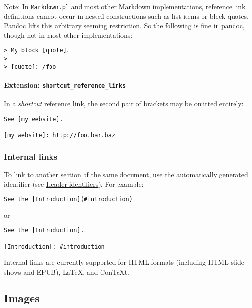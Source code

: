 \documentclass[]{article}
\let\oldparagraph\paragraph
\renewcommand{\paragraph}[1]{\oldparagraph{#1}\mbox{}}
\begin{document}
Note: In \texttt{Markdown.pl} and most other Markdown implementations,
reference link definitions cannot occur in nested constructions such as
list items or block quotes. Pandoc lifts this arbitrary seeming
restriction. So the following is fine in pandoc, though not in most
other implementations:

\begin{verbatim}
> My block [quote].
>
> [quote]: /foo
\end{verbatim}

\paragraph{\texorpdfstring{Extension:
\texttt{shortcut\_reference\_links}}{Extension: shortcut\_reference\_links}}\label{extension-shortcut_reference_links}

In a \emph{shortcut} reference link, the second pair of brackets may be
omitted entirely:

\begin{verbatim}
See [my website].

[my website]: http://foo.bar.baz
\end{verbatim}

\subsubsection{Internal links}\label{internal-links}

To link to another section of the same document, use the automatically
generated identifier (see \protect\hyperlink{header-identifiers}{Header
identifiers}). For example:

\begin{verbatim}
See the [Introduction](#introduction).
\end{verbatim}

or

\begin{verbatim}
See the [Introduction].

[Introduction]: #introduction
\end{verbatim}

Internal links are currently supported for HTML formats (including HTML
slide shows and EPUB), LaTeX, and ConTeXt.

\subsection{Images}\label{images}
\end{document}
